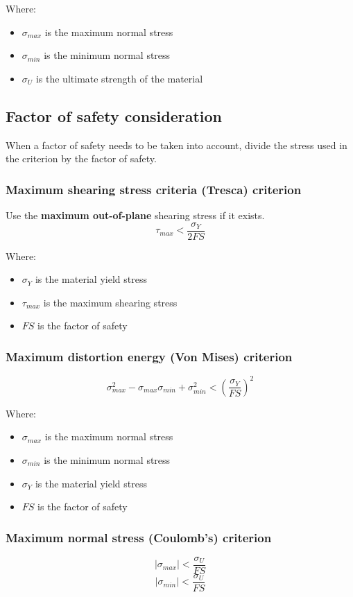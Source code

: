 \documentclass[11pt]{article}
\begin{document}
Where:
\begin{itemize}
\item \(\sigma_{max}\) is the maximum normal stress
\item \(\sigma_{min}\) is the minimum normal stress
\item \(\sigma_U\) is the ultimate strength of the material
\end{itemize}
\subsection{Factor of safety consideration}
\label{sec:orgdee677b}
When a factor of safety needs to be taken into account, divide the stress used in the criterion by the factor of safety.
\subsubsection{Maximum shearing stress criteria (Tresca) criterion}
\label{sec:orge3d2141}
Use the \textbf{maximum out-of-plane} shearing stress if it exists.
\[\tau_{max} < \frac{\sigma_Y}{2FS}\]

Where:
\begin{itemize}
\item \(\sigma_Y\) is the material yield stress
\item \(\tau_{max}\) is the maximum shearing stress
\item \(FS\) is the factor of safety
\end{itemize}
\subsubsection{Maximum distortion energy (Von Mises) criterion}
\label{sec:org06ee096}
\[\sigma_{max}^2 - \sigma_{max} \sigma_{min} + \sigma_{min}^2 < \left(\frac{\sigma_Y}{FS} \right)^2\]

Where:
\begin{itemize}
\item \(\sigma_{max}\) is the maximum normal stress
\item \(\sigma_{min}\) is the minimum normal stress
\item \(\sigma_{Y}\) is the material yield stress
\item \(FS\) is the factor of safety
\end{itemize}
\subsubsection{Maximum normal stress (Coulomb's) criterion}
\label{sec:org87361c2}
\[|\sigma_{max}| < \frac{\sigma_U}{FS}\]
\[|\sigma_{min}| < \frac{\sigma_U}{FS}\]
\end{document}
